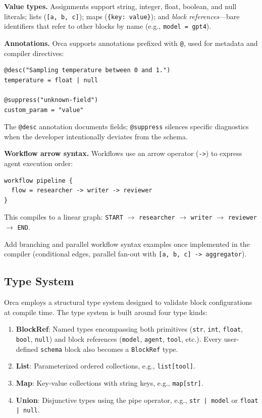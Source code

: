 \documentclass[sigconf,nonacm]{acmart}
\begin{document}
\noindent\textbf{Value types.} Assignments support string, integer, float,
boolean, and null literals; lists (\texttt{[a, b, c]}); maps
(\texttt{\{key: value\}}); and \emph{block references}---bare identifiers
that refer to other blocks by name (e.g., \texttt{model = gpt4}).

\noindent\textbf{Annotations.} Orca supports annotations prefixed with
\texttt{@}, used for metadata and compiler directives:

\begin{lstlisting}
@desc("Sampling temperature between 0 and 1.")
temperature = float | null

@suppress("unknown-field")
custom_param = "value"
\end{lstlisting}

The \texttt{@desc} annotation documents fields; \texttt{@suppress}
silences specific diagnostics when the developer intentionally deviates
from the schema.

\noindent\textbf{Workflow arrow syntax.} Workflows use an arrow operator
(\texttt{->}) to express agent execution order:

\begin{lstlisting}
workflow pipeline {
  flow = researcher -> writer -> reviewer
}
\end{lstlisting}

This compiles to a linear graph:
\texttt{START} $\rightarrow$ \texttt{researcher} $\rightarrow$
\texttt{writer} $\rightarrow$ \texttt{reviewer} $\rightarrow$ \texttt{END}.

\begin{todobox}
Add branching and parallel workflow syntax examples once implemented
in the compiler (conditional edges, parallel fan-out with
\texttt{[a, b, c] -> aggregator}).
\end{todobox}

\subsection{Type System}
\label{sec:language:types}

Orca employs a structural type system designed to validate block
configurations at compile time. The type system is built around four
type kinds:

\begin{enumerate}[leftmargin=*]
  \item \textbf{BlockRef}: Named types encompassing both primitives
        (\texttt{str}, \texttt{int}, \texttt{float}, \texttt{bool},
        \texttt{null}) and block references (\texttt{model}, \texttt{agent},
        \texttt{tool}, etc.). Every user-defined \texttt{schema} block
        also becomes a \texttt{BlockRef} type.
  \item \textbf{List}: Parameterized ordered collections, e.g.,
        \texttt{list[tool]}.
  \item \textbf{Map}: Key-value collections with string keys, e.g.,
        \texttt{map[str]}.
  \item \textbf{Union}: Disjunctive types using the pipe operator, e.g.,
        \texttt{str | model} or \texttt{float | null}.
\end{enumerate}
\end{document}
